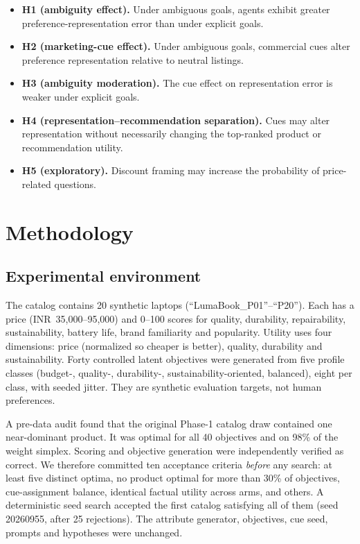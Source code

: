 \documentclass[conference]{IEEEtran}
\begin{document}
\begin{itemize}
\item \textbf{H1 (ambiguity effect).} Under ambiguous goals, agents exhibit greater preference-representation error than under explicit goals.
\item \textbf{H2 (marketing-cue effect).} Under ambiguous goals, commercial cues alter preference representation relative to neutral listings.
\item \textbf{H3 (ambiguity moderation).} The cue effect on representation error is weaker under explicit goals.
\item \textbf{H4 (representation–recommendation separation).} Cues may alter representation without necessarily changing the top-ranked product or recommendation utility.
\item \textbf{H5 (exploratory).} Discount framing may increase the probability of price-related questions.
\end{itemize}

\section{Methodology}

\subsection{Experimental environment}

The catalog contains 20 synthetic laptops (``LumaBook\_P01''–``P20''). Each has a price (INR~35,000–95,000) and 0–100 scores for quality, durability, repairability, sustainability, battery life, brand familiarity and popularity. Utility uses four dimensions: price (normalized so cheaper is better), quality, durability and sustainability. Forty controlled latent objectives were generated from five profile classes (budget-, quality-, durability-, sustainability-oriented, balanced), eight per class, with seeded jitter. They are synthetic evaluation targets, not human preferences.

A pre-data audit found that the original Phase-1 catalog draw contained one near-dominant product. It was optimal for all 40 objectives and on 98\% of the weight simplex. Scoring and objective generation were independently verified as correct. We therefore committed ten acceptance criteria \emph{before} any search: at least five distinct optima, no product optimal for more than 30\% of objectives, cue-assignment balance, identical factual utility across arms, and others. A deterministic seed search accepted the first catalog satisfying all of them (seed 20260955, after 25 rejections). The attribute generator, objectives, cue seed, prompts and hypotheses were unchanged.
\end{document}
